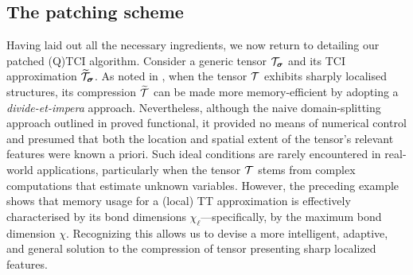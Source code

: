 \subsection{The patching scheme}
Having laid out all the necessary ingredients, we now return to detailing our patched (Q)TCI algorithm. 
Consider a generic tensor $\mathcal{T}_{\boldsymbol{\sigma}}$ and its TCI approximation $\widetilde{\mathcal{T}}_{\boldsymbol{\sigma}}$. As noted in , when the tensor $\mathcal{T}$ exhibits sharply localised structures, its compression $\widetilde{\mathcal{T}}$ can be made more memory-efficient by adopting a \textit{divide-et-impera} approach. Nevertheless, although the naive domain-splitting approach outlined in  proved functional, it provided no means of numerical control and presumed that both the location and spatial extent of the tensor’s relevant features were known a priori. Such ideal conditions are rarely encountered in real-world applications, particularly when the tensor $\mathcal{T}$ stems from complex computations that estimate unknown variables. However, the preceding example shows that memory usage for a (local) TT approximation is effectively characterised by its bond dimensions $\chi_\ell$—specifically, by the maximum bond dimension $\chi$. Recognizing this allows us to devise a more intelligent, adaptive, and general solution to the compression of tensor presenting sharp localized features.

